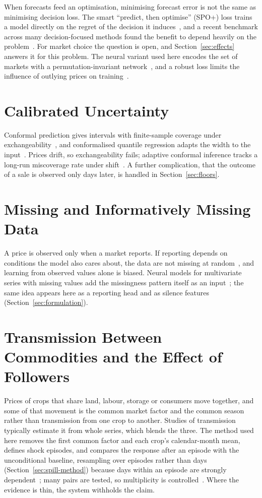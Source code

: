 When forecasts feed an optimisation, minimising forecast error is not the same as minimising decision loss. The smart ``predict, then optimise'' (SPO+) loss trains a model directly on the regret of the decision it induces~\cite{elmachtoub2022}, and a recent benchmark across many decision-focused methods found the benefit to depend heavily on the problem~\cite{mandi2024}. For market choice the question is open, and Section~\ref{sec:effects} answers it for this problem. The neural variant used here encodes the set of markets with a permutation-invariant network~\cite{zaheer2017}, and a robust loss limits the influence of outlying prices on training~\cite{huber1964}.

\section{Calibrated Uncertainty}
\label{sec:uncertainty}

Conformal prediction gives intervals with finite-sample coverage under exchangeability~\cite{vovk2005,angelopoulos2023}, and conformalised quantile regression adapts the width to the input~\cite{romano2019}. Prices drift, so exchangeability fails; adaptive conformal inference tracks a long-run miscoverage rate under shift~\cite{gibbs2021}. A further complication, that the outcome of a sale is observed only days later, is handled in Section~\ref{sec:floors}.

\section{Missing and Informatively Missing Data}
\label{sec:missing}

A price is observed only when a market reports. If reporting depends on conditions the model also cares about, the data are not missing at random~\cite{rubin1976}, and learning from observed values alone is biased. Neural models for multivariate series with missing values add the missingness pattern itself as an input~\cite{che2018}; the same idea appears here as a reporting head and as silence features (Section~\ref{sec:formulation}).

\section{Transmission Between Commodities and the Effect of Followers}
\label{sec:transmission}

Prices of crops that share land, labour, storage or consumers move together, and some of that movement is the common market factor and the common season rather than transmission from one crop to another. Studies of transmission typically estimate it from whole series, which blends the three. The method used here removes the first common factor and each crop's calendar-month mean, defines shock episodes, and compares the response after an episode with the unconditional baseline, resampling over episodes rather than days (Section~\ref{sec:spill-method}) because days within an episode are strongly dependent~\cite{kunsch1989}; many pairs are tested, so multiplicity is controlled~\cite{holm1979}. Where the evidence is thin, the system withholds the claim.

